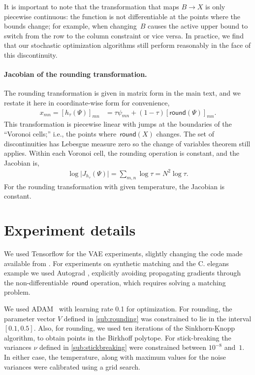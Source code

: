 It is important to note that the transformation that maps
$B \rightarrow X$ is only piecewise continuous: the function is not
differentiable at the points where the bounds change; for example,
when changing~$B$ causes the active upper bound to switch from the row
to the column constraint or vice versa.  In practice, we find
that our stochastic optimization algorithms still perform reasonably
in the face of this discontinuity.


\paragraph{Jacobian of the rounding transformation.}
The rounding transformation is given in matrix form
in the main text, and we restate it here in coordinate-wise form
for convenience,
\begin{align*}
  x_{mn} = [h_\tau(\Psi)]_{mn} &= \tau \psi_{mn} + (1-\tau) [\mathsf{round}(\Psi)]_{mn}.
\end{align*}
This transformation is piecewise linear with jumps at the boundaries
of the ``Voronoi cells;'' i.e., the points where~$\mathsf{round}(X)$
changes. The set of discontinuities has Lebesgue measure zero so the
change of variables theorem still applies.  Within each Voronoi cell,
the rounding operation is constant, and the Jacobian is,
\begin{align*}
  \log \big| J_{h_\tau}(\Psi) \big| = \sum_{m,n} \log \tau = N^2 \log \tau.
\end{align*}
For the rounding transformation with given temperature, the Jacobian
is constant.




\section{Experiment details}
We used Tensorflow \citep{Abadi2016} for the VAE experiments, slightly
changing the code made available from \cite{jang2016categorical}. For
experiments on synthetic matching and the C. elegans example we used
Autograd \citep{maclaurin2015autograd}, explicitly avoiding
propagating gradients through the non-differentiable~$\mathsf{round}$
operation, which requires solving a matching problem.

We used ADAM~\citep{kingma2014adam} with learning rate 0.1 for
optimization. For rounding, the parameter vector $V$ defined in
\ref{sub:rounding} was constrained to lie in the interval
$[0.1, 0.5]$. Also, for rounding, we used ten iterations of the
Sinkhorn-Knopp algorithm, to obtain points in the Birkhoff
polytope. For stick-breaking the variances $\nu$ defined in
\ref{sub:stickbreaking} were constrained between $10^{-8}$ and~$1$. In
either case, the temperature, along with maximum values for the noise
variances were calibrated using a grid search.
 
